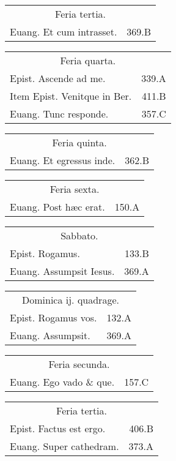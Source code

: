 \documentclass[a5paper,10pt]{book}
\def\ae{æ}
\begin{document}
\begin{multicols}{2}
\centering
\noindent
\begin{tabular}{l r}
\multicolumn{2}{c}{\color{red} Feria tertia.}\\
Euang. Et cum intrasset. & 369.B\\
\end{tabular}
\begin{tabular}{l r}
\multicolumn{2}{c}{\color{red} Feria quarta.}\\
Epist. Ascende ad me. & 339.A\\
Item Epist. Venitque in Ber. & 411.B\\
Euang. Tunc responde. & 357.C\\
\end{tabular}
\begin{tabular}{l r}
\multicolumn{2}{c}{\color{red} Feria quinta.}\\
Euang. Et egressus inde. & 362.B\\
\end{tabular}
\begin{tabular}{l r}
\multicolumn{2}{c}{\color{red} Feria sexta.}\\
Euang. Post h\ae c erat. & 150.A\\
\end{tabular}
\begin{tabular}{l r}
\multicolumn{2}{c}{\color{red} Sabbato.}\\
Epist. Rogamus. & 133.B\\
Euang. Assumpsit Iesus. & 369.A\\
\end{tabular}
\begin{tabular}{l r}
\multicolumn{2}{c}{\color{red} Dominica ij. quadrage.}\\
Epist. Rogamus vos. & 132.A\\
Euang. Assumpsit. & 369.A\\
\end{tabular}
\begin{tabular}{l r}
\multicolumn{2}{c}{\color{red} Feria secunda.}\\
Euang. Ego vado \& que. & 157.C\\
\end{tabular}
\begin{tabular}{l r}
\multicolumn{2}{c}{\color{red} Feria tertia.}\\
Epist. Factus est ergo. & 406.B\\
Euang. Super cathedram. & 373.A\\
\end{tabular}
\begin{tabular}{l r}

\end{tabular}
\end{multicols}
\end{document}
